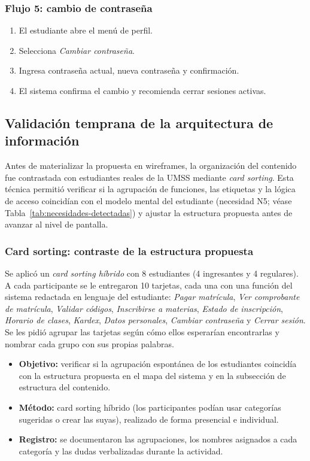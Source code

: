 \subsubsection*{Flujo 5: cambio de contraseña}

\begin{enumerate}
  \item El estudiante abre el menú de perfil.
  \item Selecciona \textit{Cambiar contraseña}.
  \item Ingresa contraseña actual, nueva contraseña y confirmación.
  \item El sistema confirma el cambio y recomienda cerrar sesiones activas.
\end{enumerate}

\subsection{Validación temprana de la arquitectura de información}

Antes de materializar la propuesta en wireframes, la organización del contenido fue contrastada con estudiantes reales de la UMSS mediante \textit{card sorting}. Esta técnica permitió verificar si la agrupación de funciones, las etiquetas y la lógica de acceso coincidían con el modelo mental del estudiante (necesidad N5; véase Tabla~\ref{tab:necesidades-detectadas}) y ajustar la estructura propuesta antes de avanzar al nivel de pantalla.

\subsubsection*{Card sorting: contraste de la estructura propuesta}

Se aplicó un \textit{card sorting híbrido} con 8 estudiantes (4 ingresantes y 4 regulares). A cada participante se le entregaron 10 tarjetas, cada una con una función del sistema redactada en lenguaje del estudiante: \textit{Pagar matrícula}, \textit{Ver comprobante de matrícula}, \textit{Validar códigos}, \textit{Inscribirse a materias}, \textit{Estado de inscripción}, \textit{Horario de clases}, \textit{Kardex}, \textit{Datos personales}, \textit{Cambiar contraseña} y \textit{Cerrar sesión}. Se les pidió agrupar las tarjetas según cómo ellos esperarían encontrarlas y nombrar cada grupo con sus propias palabras.

\begin{itemize}
  \item \textbf{Objetivo:} verificar si la agrupación espontánea de los estudiantes coincidía con la estructura propuesta en el mapa del sistema y en la subsección de estructura del contenido.
  \item \textbf{Método:} card sorting híbrido (los participantes podían usar categorías sugeridas o crear las suyas), realizado de forma presencial e individual.
  \item \textbf{Registro:} se documentaron las agrupaciones, los nombres asignados a cada categoría y las dudas verbalizadas durante la actividad.
\end{itemize}

